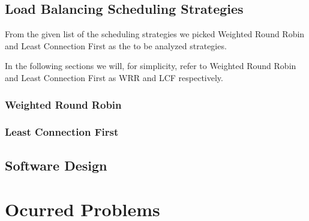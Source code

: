 \documentclass[11pt, a4paper]{article}
\begin{document}

\subsection{Load Balancing Scheduling Strategies}

From the given list of the scheduling strategies we picked
Weighted Round Robin and Least Connection First as the to be analyzed
strategies. 

In the following sections we will, for simplicity, refer to Weighted
Round Robin and Least Connection First as WRR and LCF respectively.



\subsubsection{Weighted Round Robin}



\subsubsection{Least Connection First}

\subsection{Software Design}

\section{Ocurred Problems}

\nocite{*}


\end{document}
